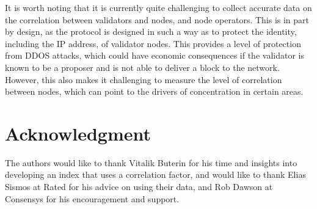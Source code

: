 \documentclass[conference]{IEEEtran}
\begin{document}
It is worth noting that it is currently quite challenging to collect accurate data on the  correlation between validators and nodes, and node operators.  This is in part by design, as the protocol is designed in such a way as to protect the identity, including the IP address, of validator nodes.  This provides a level of protection from DDOS attacks, which could have economic consequences if the validator is known to be a proposer and is not able to deliver a block to the network.  However, this also makes it challenging to measure the level of correlation between nodes, which can point to the drivers of concentration in certain areas.

\section*{Acknowledgment}

The authors would like to thank Vitalik Buterin for his time and insights into developing an index that uses a correlation factor, and would like to thank Elias Sismos at Rated for his advice on using their data, and Rob Dawson at Consensys for his encouragement and support.

\printbibliography
\end{document}
